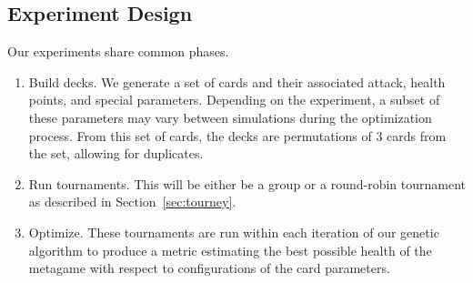 \subsection{Experiment Design}


Our experiments share common phases.

\begin{enumerate}
	\item Build decks. We generate a set of cards and their associated attack, health points, and special parameters.
	Depending on the experiment, a subset of these parameters may vary between simulations during the optimization process.
	From this set of cards, the decks are permutations of 3 cards from the set, allowing for duplicates.
	\item Run tournaments. This will be either be a group or a round-robin tournament as described in Section~\ref{sec:tourney}.
	\item Optimize. These tournaments are run within each iteration of our genetic algorithm to produce a metric estimating the best
	possible health of the metagame with respect to configurations of the card parameters. %
\end{enumerate}
